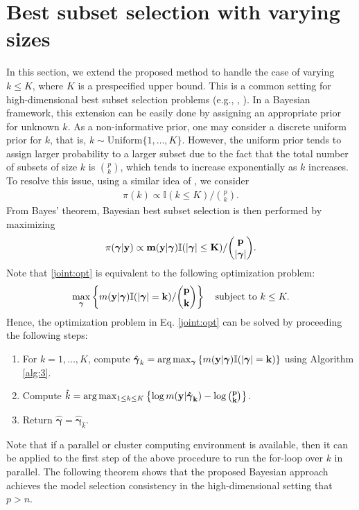 \documentclass[twocolumn]{svjour3}       %
\newcommand{\uy}{\bf y} %
\newcommand{\0}{\boldsymbol 0} %
\newcommand{\1}{\boldsymbol 1} %
\newcommand{\bg}{\boldsymbol \gamma} %
\begin{document}
\section{Best subset selection with varying sizes}\label{sec:4}
In this section, we extend the proposed method to handle the case of varying $k \leq K$, where $K$ is a prespecified upper bound. This is a common setting for high-dimensional best subset selection problems (e.g., \cite{bertsimas2016best}, \cite{liang:2013bayesian}). In a Bayesian framework, this extension can be easily done by assigning an appropriate prior for unknown $k$. As a non-informative prior, one may consider a discrete uniform prior for $k$, that is, $k \sim \text{Uniform}\{1,\ldots,K\}$. However, the uniform prior tends to assign larger probability to a larger subset due to the fact that the total number of subsets of size $k$ is $\binom{p}{k}$, which tends to increase exponentially as $k$ increases. To resolve this issue, using a similar idea of \cite{chen2008extended}, we consider
\begin{eqnarray*}
\pi(k)\propto \mathbb{I}(k\leq K) / \binom{p}{k} .
\end{eqnarray*}
From Bayes' theorem, Bayesian best subset selection is then performed by maximizing
\begin{eqnarray}\label{joint:opt}
\pi(\bg|\uy)\propto  m(\uy|\bg)\mathbb{I}(|\bg|\leq K)/\binom{p}{|\bg|} .
\end{eqnarray}
Note that \eqref{joint:opt} is equivalent to the following optimization problem:
\begin{eqnarray*}
 \max_{\bg} \left\{m(\uy|\bg)\mathbb{I}(|\bg|=k) /\binom{p}{k} \right\}  \quad \text{subject to }k\leq K.
 \end{eqnarray*}
Hence, the optimization problem in Eq. \eqref{joint:opt} can be solved by proceeding the following steps:
\begin{enumerate}
\item For $k=1,\ldots,K$, compute $\hat{\bg}_k= \arg\max_{\bg}\left\{m(\uy|\bg)\mathbb{I}(|\bg|=k)\right\}$ using Algorithm \ref{alg:3}.
\item Compute $ \hat{k}=\arg\max_{1\leq k \leq K} \left\{\log m(\uy|\hat{\bg}_k)-\log \binom{p}{k} \right\}$.
\item Return $\hat{\bg}=\hat{\bg}_{\hat{k}}$.
\end{enumerate}
Note that if a parallel or cluster computing environment is available, then it can be applied to the first step of the above procedure to run the for-loop over $k$ in parallel. The following theorem shows that the proposed Bayesian approach achieves the model selection consistency in the high-dimensional setting that $p>n$.
\end{document}
